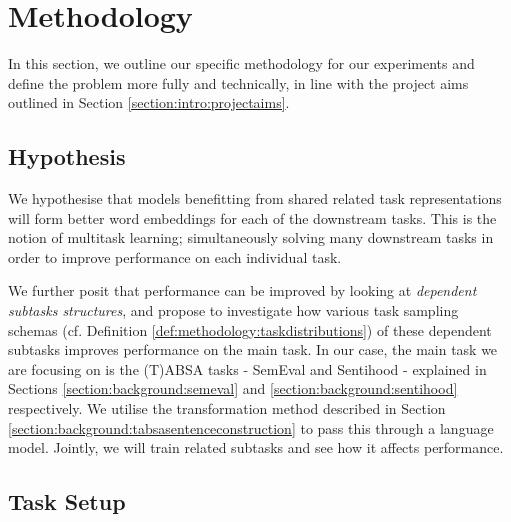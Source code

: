 

\chapter{Methodology} \label{chapter:methodology}
In this section, we outline our specific methodology for our experiments and define the problem more fully and technically, in line with the project aims outlined in Section \ref{section:intro:projectaims}.

\section{Hypothesis}
We hypothesise that models benefitting from shared related task representations will form better word embeddings for each of the downstream tasks. This is the notion of multitask learning; simultaneously solving many downstream tasks in order to improve performance on each individual task.

We further posit that performance can be improved by looking at \textit{dependent subtasks structures}, and propose to investigate how various task sampling schemas (cf. Definition \ref{def:methodology:taskdistributions}) of these dependent subtasks improves performance on the main task. In our case, the main task we are focusing on is the (T)ABSA tasks - SemEval and Sentihood - explained in Sections \ref{section:background:semeval} and \ref{section:background:sentihood} respectively. We utilise the transformation method described in Section \ref{section:background:tabsasentenceconstruction} to pass this through a language model. Jointly, we will train related subtasks and see how it affects performance.

\section{Task Setup}


